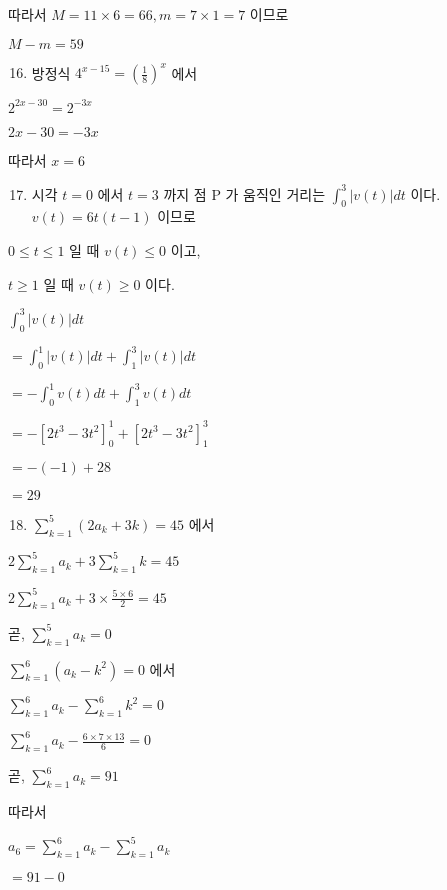 \documentclass[10pt]{article}
\begin{document}
따라서 $M=11 \times 6=66, m=7 \times 1=7$ 이므로

$M-m=59$

\begin{enumerate}
  \setcounter{enumi}{15}
  \item 방정식 $4^{x-15}=\left(\frac{1}{8}\right)^{x}$ 에서
\end{enumerate}

$2^{2 x-30}=2^{-3 x}$

$2 x-30=-3 x$

따라서 $x=6$

\begin{enumerate}
  \setcounter{enumi}{16}
  \item 시각 $t=0$ 에서 $t=3$ 까지 점 P 가 움직인 거리는 $\int_{0}^{3}|v(t)| d t$ 이다. $v(t)=6 t(t-1)$ 이므로
\end{enumerate}

$0 \leq t \leq 1$ 일 때 $v(t) \leq 0$ 이고,

$t \geq 1$ 일 때 $v(t) \geq 0$ 이다.

$\int_{0}^{3}|v(t)| d t$

$=\int_{0}^{1}|v(t)| d t+\int_{1}^{3}|v(t)| d t$

$=-\int_{0}^{1} v(t) d t+\int_{1}^{3} v(t) d t$

$=-\left[2 t^{3}-3 t^{2}\right]_{0}^{1}+\left[2 t^{3}-3 t^{2}\right]_{1}^{3}$

$=-(-1)+28$

$=29$

\begin{enumerate}
  \setcounter{enumi}{17}
  \item $\sum_{k=1}^{5}\left(2 a_{k}+3 k\right)=45$ 에서
\end{enumerate}

$2 \sum_{k=1}^{5} a_{k}+3 \sum_{k=1}^{5} k=45$

$2 \sum_{k=1}^{5} a_{k}+3 \times \frac{5 \times 6}{2}=45$

곧, $\sum_{k=1}^{5} a_{k}=0$

$\sum_{k=1}^{6}\left(a_{k}-k^{2}\right)=0$ 에서

$\sum_{k=1}^{6} a_{k}-\sum_{k=1}^{6} k^{2}=0$

$\sum_{k=1}^{6} a_{k}-\frac{6 \times 7 \times 13}{6}=0$

곧, $\sum_{k=1}^{6} a_{k}=91$

따라서

$a_{6}=\sum_{k=1}^{6} a_{k}-\sum_{k=1}^{5} a_{k}$

$=91-0$
\end{document}
